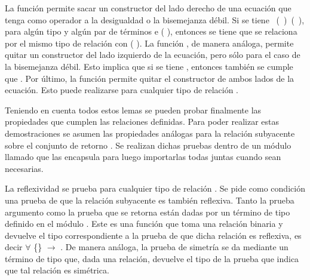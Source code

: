 La función  permite sacar un constructor  del lado derecho de una ecuación que tenga como operador a la desigualdad o la bisemejanza débil. Si se tiene \hbox{ ( )  ( )}, para algún tipo  \AgdaSymbol{:}  y algún par de términos  \AgdaSymbol{:}  \AgdaDatatype{$\bot$} e  \AgdaSymbol{:} \AgdaFunction{$\infty$} ( \AgdaDatatype{$\bot$}), entonces se tiene que  se relaciona por el mismo tipo de relación  con (\AgdaField{$\flat$} ). La función , de manera análoga, permite quitar un constructor  del lado izquierdo de la ecuación, pero sólo para el caso de la bisemejanza débil. Esto implica que si se tiene   \AgdaFunction{$\approx$} , entonces también se cumple que \AgdaField{$\flat$}  \AgdaFunction{$\approx$} . Por último, la función  permite quitar el constructor   de ambos lados de la ecuación. Esto puede realizarse para cualquier tipo de relación  \AgdaSymbol{:} .

Teniendo en cuenta todos estos lemas se pueden probar finalmente las propiedades que cumplen las relaciones definidas. Para poder realizar estas demostraciones se asumen las propiedades análogas para la relación subyacente \AgdaFunction{$\_\sim\_$} sobre el conjunto de retorno . Se realizan dichas pruebas dentro de un módulo llamado  que las encapsula para luego importarlas todas juntas cuando sean necesarias. 


La reflexividad se prueba para cualquier tipo de relación  \AgdaSymbol{:} . Se pide como condición una prueba de que la relación subyacente \AgdaFunction{$\_\sim\_$} es también reflexiva. Tanto la prueba argumento como la prueba que se retorna están dadas por un término de tipo  definido en el módulo \href{https://agda.github.io/agda-stdlib/Relation.Binary.Definitions.html}{}. Este es una función que toma una relación binaria \AgdaBound{$\_\sim\_$} y devuelve el tipo correspondiente a la prueba de que dicha relación es reflexiva, es decir $\forall$ \{\} $\rightarrow$ . De manera análoga, la prueba de simetría se da mediante un término de tipo  que, dada una relación, devuelve el tipo de la prueba que indica que tal relación es simétrica.

